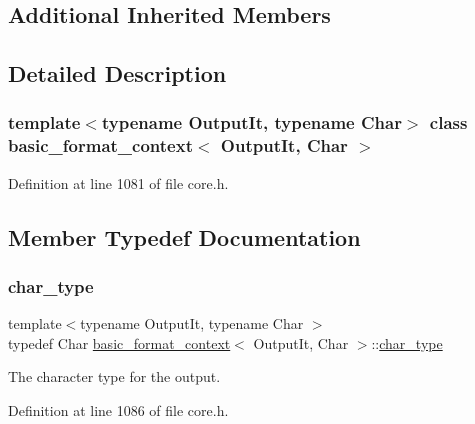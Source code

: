 \subsection*{Additional Inherited Members}


\subsection{Detailed Description}
\subsubsection*{template$<$typename Output\+It, typename Char$>$\newline
class basic\+\_\+format\+\_\+context$<$ Output\+It, Char $>$}



Definition at line 1081 of file core.\+h.



\subsection{Member Typedef Documentation}
\mbox{\label{classbasic__format__context_ab6b3447e996c0b8117e4f6d98d4e1597}} 
\subsubsection{\texorpdfstring{char\+\_\+type}{char\_type}}
{\footnotesize\ttfamily template$<$typename Output\+It, typename Char $>$ \\
typedef Char \hyperlink{classbasic__format__context}{basic\+\_\+format\+\_\+context}$<$ Output\+It, Char $>$\+::\hyperlink{classbasic__format__context_ab6b3447e996c0b8117e4f6d98d4e1597}{char\+\_\+type}}

The character type for the output. 

Definition at line 1086 of file core.\+h.

\mbox{\label{classbasic__format__context_a6486e3c9656c10eb99a4731fb169e51b}} 
